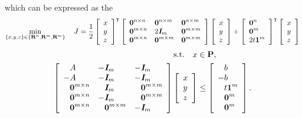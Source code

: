 \documentclass{article}
\begin{document}
    which can be expressed as the \QP
    \begin{align*}
        \min_{\{x,y,z\}\in\{\textbf{R}^n,\textbf{R}^m,\textbf{R}^m\}}\quad J = 
        \frac{1}{2}\left[\begin{array}{lllllllllllllllllll}x\\y\\z\end{array}\right]^\intercal
        \left[\begin{array}{lllllllllllllllllll}
            \textbf{0}^{n\times n} & \textbf{0}^{n\times m} & \textbf{0}^{n\times m} \\ 
            \textbf{0}^{m\times n} & 2\emph{\textbf{I}}_m & \textbf{0}^{m\times m} \\ 
            \textbf{0}^{m\times n} & \textbf{0}^{m\times m} & \textbf{0}^{m\times m}
            \end{array}\right]
        \left[\begin{array}{lllllllllllllllllll}
            x\\y\\z
            \end{array}\right]
        +
        \left[\begin{array}{lllllllllllllllllll}
            \textbf{0}^n \\ \textbf{0}^m \\ 2t\textbf{1}^m
            \end{array}\right]^\intercal
        \left[\begin{array}{lllllllllllllllllll}
            x\\y\\z
            \end{array}\right]
    \end{align*}
    \begin{align*}
        \st\quad x&\in\poly,\\
        \mat{
        \minus A         & -\eye_m         & -\eye_m \\ 
        -A              & -\eye_m         & -\eye_m \\ 
        \minus\zeros^{m\times n}    & \minus\eye_m    & \minus\zeros^{m\times m} \\ 
        \minus\zeros^{m\times n}    & -\eye_m         & \minus\zeros^{m\times m}\\
        \minus\zeros^{m\times n}    & \minus\zeros^{m\times m} & -\eye_m
        }
        \mat{x\\y\\z}
        &\leq
        \mat{
            \minus b\\
            -b\\
            \minus t\ones^m\\ 
            \minus\zeros^m \\ 
            \minus\zeros^m
            }.
    \end{align*}

\clearpage
\end{document}
